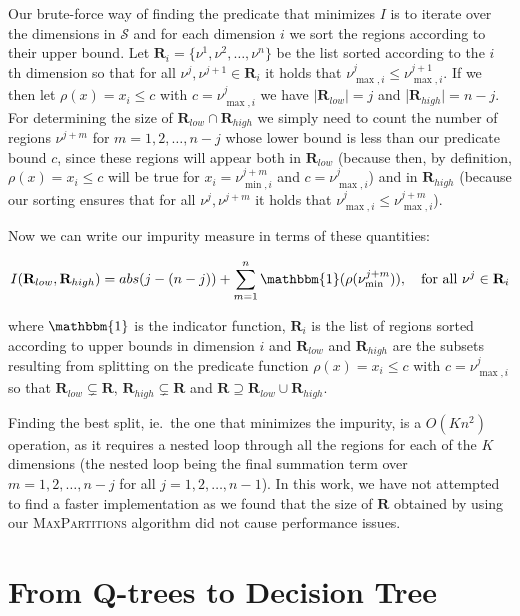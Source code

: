 Our brute-force way of finding the predicate that minimizes $I$ is to iterate
over the dimensions in $\mathcal{S}$ and for each dimension $i$ we sort the
regions according to their upper bound. Let $\mathbf{R}_i = \{ \nu^1, \nu^2,
\ldots, \nu^n \}$ be the list sorted according to the $i$ th dimension so that
for all $\nu^j, \nu^{j+1} \in \mathbf{R}_{i}$ it holds that $\nu^{j}_{\max,i} \le
\nu^{j+1}_{\max,i}$. If we then let $\rho(x) = x_i \le c$ with $c =
\nu^{j}_{\max,i}$ we have $|\mathbf{R}_{low}| = j$ and |$\mathbf{R}_{high}| = n
- j$. For determining the size of $\mathbf{R}_{low} \cap \mathbf{R}_{high}$ we
simply need to count the number of regions $\nu^{j+m}$ for $m = 1, 2, \ldots,
n-j$ whose lower bound is less than our predicate bound $c$, since these regions
will appear both in $\mathbf{R}_{low}$ (because then, by definition, $\rho(x) = x_i
\le c$ will be true for $x_i = \nu^{j+m}_{\min,i}$ and $c = \nu^{j}_{\max,i}$)
and in $\mathbf{R}_{high}$ (because our sorting ensures that for all
$\nu^{j},\nu^{j+m}$ it holds that $\nu^{j}_{\max,i} \le \nu^{j+m}_{\max,i}$).

Now we can write our impurity measure in terms of these quantities:

\[
    I(\mathbf{R}_{low}, \mathbf{R}_{high}) = abs(j - (n - j)) +
    \sum^{n}_{m=1} \mathbbm{1}(\rho(\nu^{j+m}_{\min})), \quad
    \text{for all }\nu^{j} \in \mathbf{R}_{i}
\] 

\noindent
where $\mathbbm{1}$ is the indicator function, $\mathbf{R}_{i}$ is the list of
regions sorted according to upper bounds in dimension $i$ and $\mathbf{R}_{low}$ and
$\mathbf{R}_{high}$ are the subsets resulting from splitting on the predicate
function $\rho(x) = x_i \le c$ with $c = \nu^{j}_{\max,i}$ so that
$\mathbf{R}_{low} \subsetneq \mathbf{R}$, $\mathbf{R}_{high} \subsetneq
\mathbf{R}$ and $\mathbf{R} \supseteq \mathbf{R}_{low} \cup \mathbf{R}_{high}$.

Finding the best split, ie.\ the one that minimizes the impurity, is a $O(Kn^2)$
operation, as it requires a nested loop through all the regions for each
of the $K $dimensions (the nested loop being the final summation term over $m =
1, 2, \ldots, n - j$ for all $j = 1, 2, \ldots, n - 1$). In this work, we have
not attempted to find a faster implementation as we found that the size of
$\mathbf{R}$ obtained by using our \textsc{MaxPartitions} algorithm did not
cause performance issues.


\section{From Q-trees to Decision Tree}%
\label{sec:convergeToDT}

